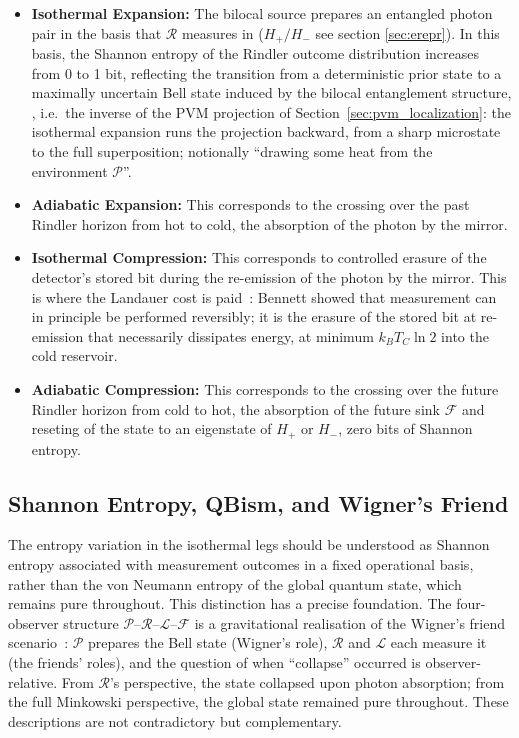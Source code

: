 \begin{itemize} 
\item {\bf Isothermal Expansion:} The bilocal source prepares an entangled photon pair in the basis that $\mathcal{R}$ measures in ($H_+/H_-$ see section \ref{sec:erepr}). In this basis, the Shannon entropy of the Rindler outcome distribution increases from 0 to 1 bit, reflecting the transition from a deterministic prior state to a maximally uncertain Bell state induced by the bilocal entanglement structure,
  , i.e.\ the inverse of the PVM projection 
of Section~\ref{sec:pvm_localization}: 
the isothermal expansion runs the projection 
backward, from a sharp microstate to the 
full superposition; notionally ``drawing some heat from the environment $\mathcal{P}$''.
\item {\bf Adiabatic Expansion:} This corresponds to the crossing over the past Rindler horizon from hot to cold, the absorption of the photon by the mirror.
\item {\bf Isothermal Compression:} This corresponds to controlled 
erasure of the detector's stored bit during the re-emission of the photon 
by the mirror.
This is where the Landauer cost is 
paid~\cite{landauer1961irreversibility, 
bennett1982thermodynamics}: Bennett showed that 
measurement can in principle be performed 
reversibly; it is the erasure of the stored bit 
at re-emission that necessarily dissipates energy, 
at minimum $k_BT_C \ln 2$ into the cold reservoir.
\item {\bf Adiabatic Compression:} This corresponds to the crossing over the future Rindler horizon from cold to hot, the absorption of the future sink $\mathcal{F}$ and reseting of the state to an eigenstate of $H_+$ or $H_-$, zero bits of Shannon entropy. 
\end{itemize}


\subsection{Shannon Entropy, QBism, and 
Wigner's Friend}

The entropy variation in the isothermal legs should be 
understood as Shannon entropy associated with 
measurement outcomes in a fixed operational basis, 
rather than the von Neumann entropy of the global 
quantum state, which remains pure throughout. This 
distinction has a precise foundation. The four-observer 
structure $\mathcal{P}$--$\mathcal{R}$--$\mathcal{L}$--$\mathcal{F}$ 
is a gravitational realisation of the Wigner's friend 
scenario~\cite{brukner2018no}: $\mathcal{P}$ 
prepares the Bell state (Wigner's role), 
$\mathcal{R}$ and $\mathcal{L}$ each measure it 
(the friends' roles), and the question of when 
``collapse'' occurred is observer-relative. From 
$\mathcal{R}$'s perspective, the state collapsed 
upon photon absorption; from the full Minkowski 
perspective, the global state remained pure 
throughout. These descriptions are not contradictory 
but complementary.

